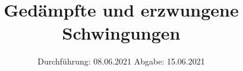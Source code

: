 

\subject{354}
\title{Gedämpfte und erzwungene Schwingungen}
\date{%
  Durchführung: 08.06.2021
  \hspace{3em}
  Abgabe: 15.06.2021
}



\maketitle
\thispagestyle{empty}
\tableofcontents
\newpage



%




\printbibliography{}


